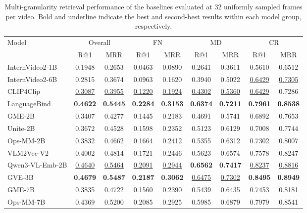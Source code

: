\begin{table}[t]
\centering
\caption{Multi-granularity retrieval performance of the baselines evaluated at 32 uniformly sampled frames per video. Bold and underline indicate the best and second-best results within each model group, respectively.}
\label{mglvr:tab:main_results_32f}
\setlength{\tabcolsep}{2pt}
\begin{tabular}{@{}l|*{8}{c}@{}}
\toprule
Model & \multicolumn{2}{c|}{Overall} & \multicolumn{2}{c|}{FN} & \multicolumn{2}{c|}{MD} & \multicolumn{2}{c}{CR} \\
      & R@1 & MRR & R@1 & MRR & R@1 & MRR & R@1 & MRR \\
\midrule
InternVideo2-1B  & 0.1948 & 0.2653 & 0.0463 & 0.0890 & 0.2641 & 0.3611 & 0.5610 & 0.6512 \\
InternVideo2-6B  & 0.2815 & 0.3674 & 0.0963 & 0.1620 & 0.3940 & 0.5022 & \underline{0.6429} & \underline{0.7305} \\
CLIP4Clip        & \underline{0.3087} & \underline{0.3955} & \underline{0.1220} & \underline{0.1924} & \underline{0.4302} & \underline{0.5360} & \underline{0.6429} & 0.7286 \\
LanguageBind     & \textbf{0.4622} & \textbf{0.5445} & \textbf{0.2284} & \textbf{0.3153} & \textbf{0.6374} & \textbf{0.7211} & \textbf{0.7961} & \textbf{0.8538} \\
\midrule
GME-2B           & 0.3407 & 0.4277 & 0.1445 & 0.2183 & 0.4691 & 0.5741 & 0.6892 & 0.7653 \\
Unite-2B         & 0.3672 & 0.4528 & 0.1598 & 0.2352 & 0.5123 & 0.6129 & 0.7008 & 0.7744 \\
Ops-MM-2B        & 0.3832 & 0.4662 & 0.1664 & 0.2412 & 0.5355 & 0.6312 & 0.7302 & 0.8007 \\
VLM2Vec-V2       & 0.4002 & 0.4814 & 0.1721 & 0.2446 & 0.5623 & 0.6574 & 0.7578 & 0.8247 \\
Qwen3-VL-Emb-2B  & \underline{0.4640} & \underline{0.5464} & \underline{0.2091} & \underline{0.2944} & \textbf{0.6562} & \textbf{0.7417} & \underline{0.8237} & \underline{0.8816} \\
GVE-3B           & \textbf{0.4679} & \textbf{0.5487} & \textbf{0.2187} & \textbf{0.3062} & \underline{0.6475} & \underline{0.7302} & \textbf{0.8495} & \textbf{0.8949} \\
\midrule
GME-7B           & 0.3835 & 0.4722 & 0.1560 & 0.2390 & 0.5439 & 0.6435 & 0.7453 & 0.8181 \\
Ops-MM-7B        & 0.4369 & 0.5200 & 0.2085 & 0.2925 & 0.5985 & 0.6879 & 0.7979 & 0.8541 \\

\end{tabular}
\end{table}
